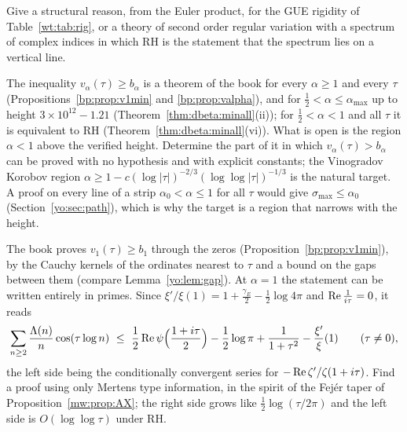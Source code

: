 \begin{problem}\label{wt:prob:second}
Give a structural reason, from the Euler product, for the GUE rigidity of Table~\ref{wt:tab:rig}, or a theory of second order regular variation with a spectrum of complex indices in which RH is the statement that the spectrum lies on a vertical line.
\end{problem}

\begin{problem}[The symbol inequality below the line $\alpha=1$]\label{yo:op:symbol}
The inequality $v_\alpha(\tau)\ge b_\alpha$ is a theorem of the book for every $\alpha\ge1$ and every $\tau$ (Propositions~\ref{bp:prop:v1min} and \ref{bp:prop:valpha}), and for $\frac12<\alpha\le\alpha_{\max}$ up to height $3\times10^{12}-1.21$ (Theorem~\ref{thm:dbeta:minall}(ii)); for $\frac12<\alpha<1$ and all $\tau$ it is equivalent to RH (Theorem~\ref{thm:dbeta:minall}(vi)). What is open is the region $\alpha<1$ above the verified height. Determine the part of it in which $v_\alpha(\tau)>b_\alpha$ can be proved with no hypothesis and with explicit constants; the Vinogradov Korobov region $\alpha\ge1-c(\log|\tau|)^{-2/3}(\log\log|\tau|)^{-1/3}$ \cite{Vinogradov58,Korobov58} is the natural target. A proof on every line of a strip $\alpha_0<\alpha\le1$ for all $\tau$ would give $\sigma_{\max}\le\alpha_0$ (Section~\ref{yo:sec:path}), which is why the target is a region that narrows with the height.
\end{problem}

\begin{problem}[A prime side proof at $\alpha=1$]\label{yo:op:primes}
The book proves $v_1(\tau)\ge b_1$ through the zeros (Proposition~\ref{bp:prop:v1min}), by the Cauchy kernels of the ordinates nearest to $\tau$ and a bound on the gaps between them (compare Lemma~\ref{yo:lem:gap}). At $\alpha=1$ the statement can be written entirely in primes. Since $\xi'/\xi(1)=1+\frac{\gamma_E}2-\frac12\log4\pi$ and $\operatorname{Re}\frac1{i\tau}=0$, it reads
\[
\sum_{n\ge2}\frac{\Lambda(n)}{n}\cos(\tau\log n)\ \le\ \frac12\re\psi\Bigl(\frac{1+i\tau}2\Bigr)-\frac12\log\pi+\frac1{1+\tau^2}-\frac{\xi'}{\xi}(1)\qquad(\tau\ne0),
\]
the left side being the conditionally convergent series for $-\operatorname{Re}\zeta'/\zeta(1+i\tau)$. Find a proof using only Mertens type information, in the spirit of the Fej\'er taper of Proposition~\ref{mw:prop:AX}; the right side grows like $\frac12\log(\tau/2\pi)$ and the left side is $O(\log\log\tau)$ under RH.
\end{problem}

